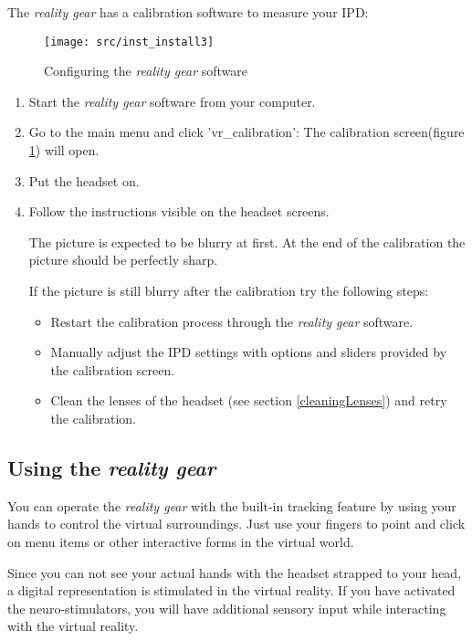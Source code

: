 The \emph{\poke{} reality gear} has a calibration software to measure your IPD:
\begin{figure}[!ht]
\begin{center}
\texttt{[image: src/inst\_install3]}
\end{center}
\caption[Configuring the \emph{\pokeT{} reality gear} software]{Configuring the \emph{\poke{} reality gear} software}
\label{gear_ipd}
\end{figure}
\begin{enumerate}
\item Start the \emph{\poke{} reality gear} software from your computer.
\item Go to the main menu and click 'vr\_calibration': The calibration screen(figure \ref{gear_ipd}) will open.
\item Put the headset on.
\item Follow the instructions visible on the headset screens.

The picture is expected to be blurry at first. At the end of the calibration the picture should be perfectly sharp.

If the picture is still blurry after the calibration try the following steps:
\begin{itemize}
\item Restart the calibration process through the \emph{\poke{} reality gear} software.
\item Manually adjust the IPD settings with options and sliders provided by the calibration screen.
\item Clean the lenses of the headset (see section \ref{cleaningLenses}) and retry the calibration.
\end{itemize}
\end{enumerate}

\subsection[Using the \emph{\pokeT{} reality gear}]{Using the \emph{\poke{} reality gear}}

You can operate the \emph{\poke{} reality gear} with the built-in tracking feature by using your hands to control the virtual surroundings. Just use your fingers to point and click on menu items or other interactive forms in the virtual world.

Since you can not see your actual hands with the headset strapped to your head, a digital representation is stimulated in the virtual reality. If you have activated the neuro-stimulators, you will have additional sensory input while interacting with the virtual reality.

